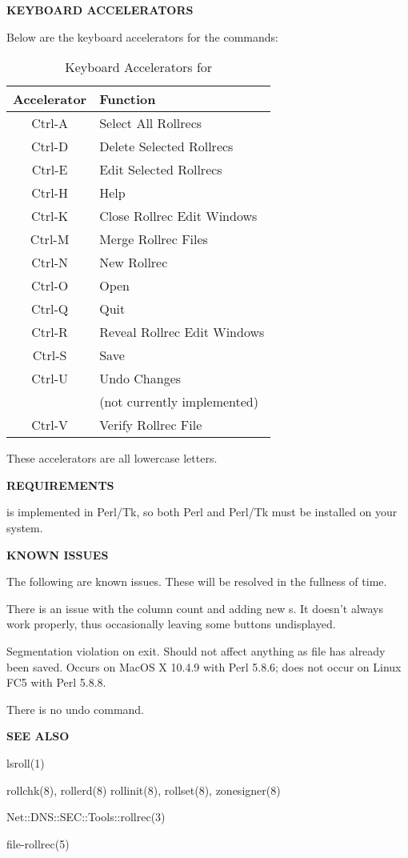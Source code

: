 {\bf KEYBOARD ACCELERATORS}

Below are the keyboard accelerators for the  commands:

\begin{table}[ht]
\begin{center}
\begin{tabular}{|c|l|}
\hline
{\bf Accelerator} & {\bf Function} \\
\hline
Ctrl-A & Select All Rollrecs \\
Ctrl-D & Delete Selected Rollrecs \\
Ctrl-E & Edit Selected Rollrecs \\
Ctrl-H & Help \\
Ctrl-K & Close Rollrec Edit Windows \\
Ctrl-M & Merge Rollrec Files \\
Ctrl-N & New Rollrec \\
Ctrl-O & Open \\
Ctrl-Q & Quit \\
Ctrl-R & Reveal Rollrec Edit Windows \\
Ctrl-S & Save \\
Ctrl-U & Undo Changes \\
       & (not currently implemented) \\
Ctrl-V & Verify Rollrec File \\
\hline
\end{tabular}
\end{center}
\caption{Keyboard Accelerators for }
\end{table}

These accelerators are all lowercase letters.

{\bf REQUIREMENTS}

 is implemented in Perl/Tk, so both Perl and Perl/Tk must be
installed on your system.

{\bf KNOWN ISSUES}

The following are known issues.  These will be resolved in the fullness of time.

\begin{description}

\item There is an issue with the column count and adding new s.
It doesn't always work properly, thus occasionally leaving some
 buttons undisplayed.

\item Segmentation violation on exit.  Should not affect anything as file has
already been saved.  Occurs on MacOS X 10.4.9 with Perl 5.8.6; does not occur
on Linux FC5 with Perl 5.8.8.

\item There is no undo command.

\end{description}

{\bf SEE ALSO}

lsroll(1)

rollchk(8),
rollerd(8)
rollinit(8),
rollset(8),
zonesigner(8)

Net::DNS::SEC::Tools::rollrec(3)

file-rollrec(5)

